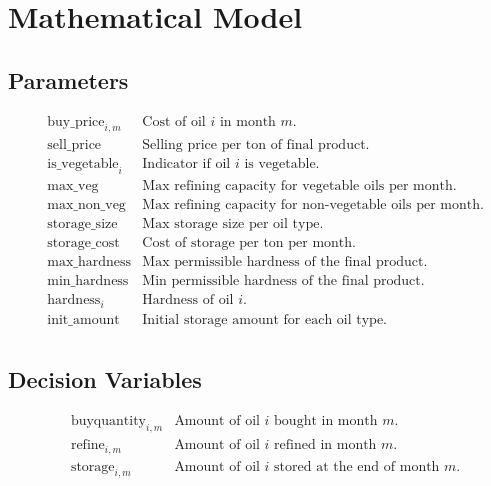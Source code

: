 \documentclass{article}
\begin{document}
\section*{Mathematical Model}

\subsection*{Parameters}

\begin{align*}
& \text{buy\_price}_{i,m} & \text{Cost of oil } i \text{ in month } m. \\
& \text{sell\_price} & \text{Selling price per ton of final product.} \\
& \text{is\_vegetable}_i & \text{Indicator if oil } i \text{ is vegetable.} \\
& \text{max\_veg} & \text{Max refining capacity for vegetable oils per month.} \\
& \text{max\_non\_veg} & \text{Max refining capacity for non-vegetable oils per month.} \\
& \text{storage\_size} & \text{Max storage size per oil type.} \\
& \text{storage\_cost} & \text{Cost of storage per ton per month.} \\
& \text{max\_hardness} & \text{Max permissible hardness of the final product.} \\
& \text{min\_hardness} & \text{Min permissible hardness of the final product.} \\
& \text{hardness}_i & \text{Hardness of oil } i. \\
& \text{init\_amount} & \text{Initial storage amount for each oil type.} \\
\end{align*}

\subsection*{Decision Variables}

\begin{align*}
& \text{buyquantity}_{i,m} & \text{Amount of oil } i \text{ bought in month } m. \\
& \text{refine}_{i,m} & \text{Amount of oil } i \text{ refined in month } m. \\
& \text{storage}_{i,m} & \text{Amount of oil } i \text{ stored at the end of month } m. \\
\end{align*}
\end{document}
